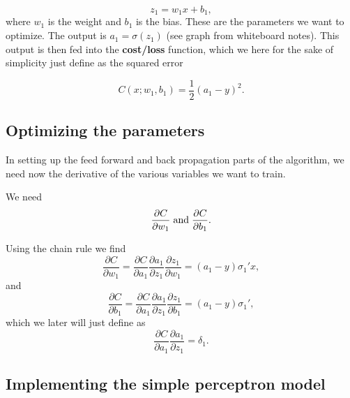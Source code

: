 \documentclass[%
oneside,                 %
final,                   %
10pt]{article}
\begin{document}
\[
z_1 = w_1x+b_1,
\]
where $w_1$ is the weight and $b_1$ is the bias. These are the
parameters we want to optimize.  The output is $a_1=\sigma(z_1)$ (see
graph from whiteboard notes). This output is then fed into the
\textbf{cost/loss} function, which we here for the sake of simplicity just
define as the squared error

\[
C(x;w_1,b_1)=\frac{1}{2}(a_1-y)^2.
\]

\subsection{Optimizing the parameters}

In setting up the feed forward and back propagation parts of the
algorithm, we need now the derivative of the various variables we want
to train.

We need
\[
\frac{\partial C}{\partial w_1} \hspace{0.1cm}\mathrm{and}\hspace{0.1cm}\frac{\partial C}{\partial b_1}. 
\]

Using the chain rule we find 
\[
\frac{\partial C}{\partial w_1}=\frac{\partial C}{\partial a_1}\frac{\partial a_1}{\partial z_1}\frac{\partial z_1}{\partial w_1}=(a_1-y)\sigma_1'x,
\]
and
\[
\frac{\partial C}{\partial b_1}=\frac{\partial C}{\partial a_1}\frac{\partial a_1}{\partial z_1}\frac{\partial z_1}{\partial b_1}=(a_1-y)\sigma_1',
\]
which we later will just define as
\[
\frac{\partial C}{\partial a_1}\frac{\partial a_1}{\partial z_1}=\delta_1.
\]

\subsection{Implementing the simple perceptron model}
\end{document}
